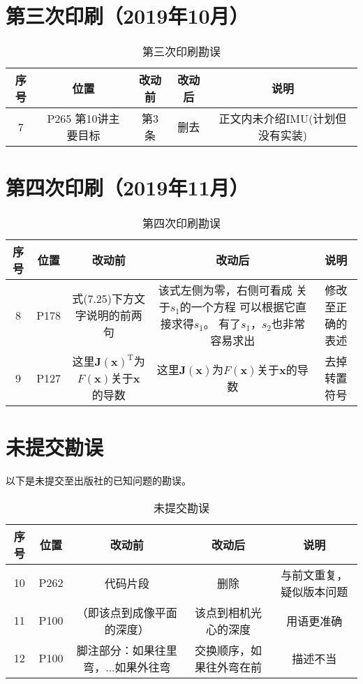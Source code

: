 \documentclass[lang=cn,11pt,numbers]{errata}
\begin{document}
\section{第三次印刷（2019年10月）}
\begin{table}[!htp]
	\centering
	\caption{第三次印刷勘误}
	\begin{tabular}{c|cccc}
		\hline\hline
		序号 & 位置 & 改动前 & 改动后 & 说明 \\\hline
		7 & P265 第10讲主要目标 & 第3条 & 删去 & 正文内未介绍IMU(计划但没有实装) \\
		\hline \hline
	\end{tabular}
\end{table}

\section{第四次印刷（2019年11月）}
\begin{table}[!htp]
	\centering
	\caption{第四次印刷勘误}
	\begin{tabular}{c|cccc}
		\hline\hline
		序号 & 位置 & 改动前 & 改动后 & 说明 \\\hline
		8 & P178  & 式(7.25)下方文字说明的前两句 & \makecell[c]{该式左侧为零，右侧可看成\\关于$s_1$的一个方程\\可以根据它直接求得$s_1$。\\有了$s_1$，$s_2$也非常容易求出} & 修改至正确的表述 \\
		\hline 
        9 & P127  & 这里$\bm{J}(\bm{x})^\mathrm{T}$为$F(\bm{x})$关于$\bm{x}$的导数 & 这里$\bm{J}(\bm{x})$为$F(\bm{x})$关于$\bm{x}$的导数 & 去掉转置符号 \\
        \hline \hline
	\end{tabular}
\end{table}

\section{未提交勘误}
以下是未提交至出版社的已知问题的勘误。
\begin{table}[!htp]
	\centering
	\caption{未提交勘误}
	\begin{tabular}{c|cccc}
		\hline\hline
		序号 & 位置 & 改动前 & 改动后 & 说明 \\\hline
		10 & P262  & 代码片段 & 删除 & 与前文重复，疑似版本问题 \\
		\hline 
		11 & P100  & （即该点到成像平面的深度） & 该点到相机光心的深度 & 用语更准确 \\ \hline
		12 & P100  & 脚注部分：如果往里弯，...如果外往弯 & 交换顺序，如果往外弯在前 & 描述不当 \\ \hline
		\hline \hline
	\end{tabular}
\end{table}
\end{document}
